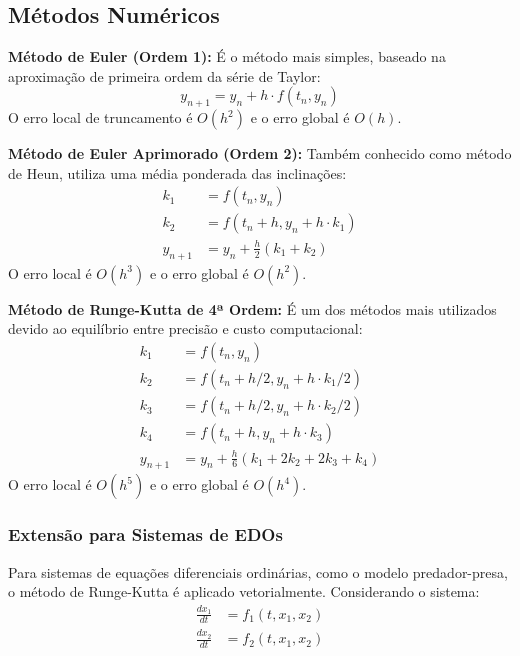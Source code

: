 \documentclass[11pt,a4paper]{article}
\begin{document}
\subsection{Métodos Numéricos}

\textbf{Método de Euler (Ordem 1):} É o método mais simples, baseado na aproximação de primeira ordem da série de Taylor:
\begin{equation}
    y_{n+1} = y_n + h \cdot f(t_n, y_n)
\end{equation}
O erro local de truncamento é $O(h^2)$ e o erro global é $O(h)$.

\textbf{Método de Euler Aprimorado (Ordem 2):} Também conhecido como método de Heun, utiliza uma média ponderada das inclinações:
\begin{align}
    k_1 &= f(t_n, y_n) \\
    k_2 &= f(t_n + h, y_n + h \cdot k_1) \\
    y_{n+1} &= y_n + \frac{h}{2}(k_1 + k_2)
\end{align}
O erro local é $O(h^3)$ e o erro global é $O(h^2)$.

\textbf{Método de Runge-Kutta de 4ª Ordem:} É um dos métodos mais utilizados devido ao equilíbrio entre precisão e custo computacional:
\begin{align}
    k_1 &= f(t_n, y_n) \\
    k_2 &= f(t_n + h/2, y_n + h \cdot k_1/2) \\
    k_3 &= f(t_n + h/2, y_n + h \cdot k_2/2) \\
    k_4 &= f(t_n + h, y_n + h \cdot k_3) \\
    y_{n+1} &= y_n + \frac{h}{6}(k_1 + 2k_2 + 2k_3 + k_4)
\end{align}
O erro local é $O(h^5)$ e o erro global é $O(h^4)$.

\subsubsection{Extensão para Sistemas de EDOs}

Para sistemas de equações diferenciais ordinárias, como o modelo predador-presa, o método de Runge-Kutta é aplicado vetorialmente. Considerando o sistema:
\begin{align}
    \frac{dx_1}{dt} &= f_1(t, x_1, x_2) \\
    \frac{dx_2}{dt} &= f_2(t, x_1, x_2)
\end{align}
\end{document}

